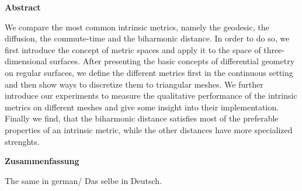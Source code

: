 

\clearemptydoublepage
{}
{}





\vspace*{2cm}
\begin{center}
{\Large \bfseries Abstract}
\end{center}
\vspace{1cm}

We compare the most common intrinsic metrics, namely the geodesic, the diffusion, the commute-time and the biharmonic distance.
In order to do so, we first introduce the concept of metric spaces and apply it to the space of three-dimensional surfaces.
After presenting the basic concepts of differential geometry on regular surfaces, we define the different metrics first in the continuous setting and then show ways to discretize them to triangular meshes.
We further introduce our experiments to measure the qualitative performance of the intrinsic metrics on different meshes and give some insight into their implementation.
Finally we find, that the biharmonic distance satisfies most of the preferable properties of an intrinsic metric, while the other distances have more specialized strenghts.

\vspace*{2cm}
\begin{center}
{\Large \bfseries Zusammenfassung}
\end{center}
\vspace{1cm}

The same in german/ Das selbe in Deutsch.
